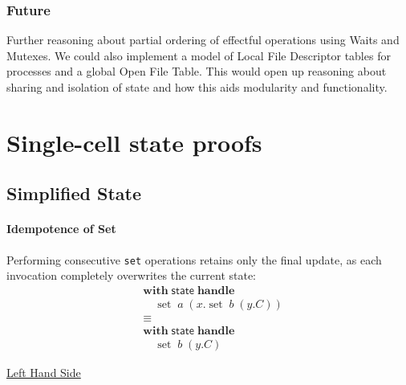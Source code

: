 \documentclass[logo,bsc,singlespacing,parskip]{infthesis}
\begin{document}
\subsection*{Future}
Further reasoning about partial ordering of effectful operations using Waits and Mutexes. We could also implement a model of Local File Descriptor tables for processes and a global Open File Table. This would open up reasoning about sharing and isolation of state and how this aids modularity and functionality.  

% 




\appendix

\chapter{Single-cell state proofs} 

\section{Simplified State} \label{full-simplified-single-cell-state-proof}

\subsubsection*{Idempotence of Set}
Performing consecutive \lstinline{set} operations retains only the final update, as each invocation completely overwrites the current state:
\[
\begin{aligned}
    &\mathsf{\textbf{with}} \; \mathsf{state} \; \mathsf{\textbf{handle}} \\
    &\quad \operatorname{set} \; a \; (x. \operatorname{set} \; b \; (y. C)) \\
    &\equiv \\
    &\mathsf{\textbf{with}} \; \mathsf{state} \; \mathsf{\textbf{handle}} \\
    &\quad \operatorname{set} \; b \; (y. C)
\end{aligned}
\]

\underline{Left Hand Side}
\end{document}
